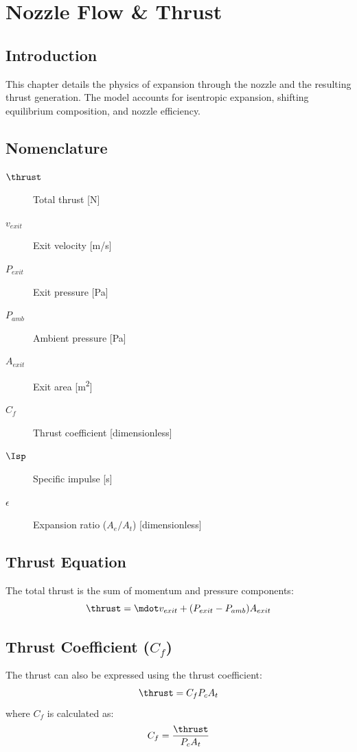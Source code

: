 \section{Nozzle Flow \& Thrust}

\subsection{Introduction}
This chapter details the physics of expansion through the nozzle and the resulting thrust generation. The model accounts for isentropic expansion, shifting equilibrium composition, and nozzle efficiency.

\subsection{Nomenclature}
\begin{description}
    \item[\(\thrust\)] Total thrust [\si{N}]
    \item[\(v_{exit}\)] Exit velocity [\si{m/s}]
    \item[\(P_{exit}\)] Exit pressure [\si{Pa}]
    \item[\(P_{amb}\)] Ambient pressure [\si{Pa}]
    \item[\(A_{exit}\)] Exit area [\si{m^2}]
    \item[\(C_f\)] Thrust coefficient [dimensionless]
    \item[\(\Isp\)] Specific impulse [\si{s}]
    \item[\(\epsilon\)] Expansion ratio (\(A_e/A_t\)) [dimensionless]
\end{description}

\subsection{Thrust Equation}
The total thrust is the sum of momentum and pressure components:
\begin{equation}
\thrust = \mdot v_{exit} + (P_{exit} - P_{amb}) A_{exit}
\end{equation}

\subsection{Thrust Coefficient (\(C_f\))}
The thrust can also be expressed using the thrust coefficient:
\begin{equation}
\thrust = C_f P_c A_t
\end{equation}
where \(C_f\) is calculated as:
\begin{equation}
C_f = \frac{\thrust}{P_c A_t}
\end{equation}

